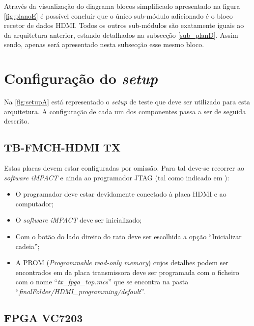 \documentclass[11pt,a4paper]{article}
\begin{document}
	Através da visualização do diagrama blocos simplificado apresentado na figura \ref{fig:planoE} é possível concluir que o único sub-módulo adicionado é o bloco recetor de dados HDMI. Todos os outros sub-módulos são exatamente iguais ao da arquitetura anterior, estando detalhados na subsecção \ref{sub_planD}. Assim sendo, apenas será apresentado nesta subsecção esse mesmo bloco.

	\section{Configuração do \textit{setup}}
	
	Na \cref{fig:setupA} está representado o \textit{setup} de teste que deve ser utilizado para esta arquitetura. A configuração de cada um dos componentes passa a ser de seguida descrito.
	

	\subsection{TB-FMCH-HDMI TX}
	Estas placas devem estar configuradas por omissão. Para tal deve-se recorrer ao \textit{software iMPACT} e ainda ao programador JTAG (tal como indicado em \cite{R025}):
	\begin{itemize}
		\item O programador deve estar devidamente conectado à placa HDMI e ao computador;
		\item O \textit{software iMPACT} deve ser inicializado;
		\item Com o botão do lado direito do rato deve ser escolhida a opção ``Inicializar cadeia'';
		\item A PROM (\textit{Programmable read-only memory}) cujos detalhes podem ser encontrados em \cite{R026} da placa transmissora deve ser programada com o ficheiro com o nome ``\textit{tx\_fpga\_top.mcs}'' que se encontra na pasta ``\textit{finalFolder/HDMI\_programming/default}''.
	\end{itemize}
	
	
	\subsection{FPGA VC7203}
	
\end{document}
